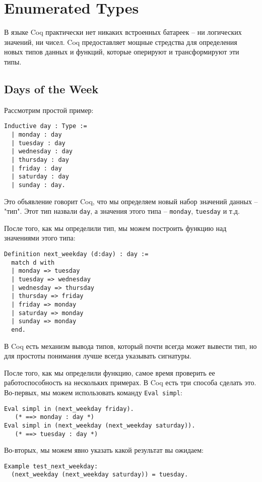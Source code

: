 \documentclass[12pt,a4paper,draft]{article}
\begin{document}
\section{Enumerated Types}

В языке Coq практически нет никаких встроенных батареек -- ни логических значений, ни чисел. Coq предоставляет мощные стредства для определения новых типов данных и функций, которые оперируют и трансформируют эти типы.

\subsection{Days of the Week}
Рассмотрим простой пример:

\begin{verbatim}
Inductive day : Type :=
  | monday : day
  | tuesday : day
  | wednesday : day
  | thursday : day
  | friday : day
  | saturday : day
  | sunday : day.
\end{verbatim}

Это объявление говорит Coq, что мы определяем новый набор значений данных -- "тип". Этот тип назвали \texttt{day}, а значения этого типа -- \texttt{monday}, \texttt{tuesday} и т.д.

После того, как мы определили тип, мы можем построить функцию над значениями этого типа:

\begin{verbatim}
Definition next_weekday (d:day) : day :=
  match d with
  | monday => tuesday
  | tuesday => wednesday
  | wednesday => thursday
  | thursday => friday
  | friday => monday
  | saturday => monday
  | sunday => monday
  end.
\end{verbatim}

В Coq есть механизм вывода типов, который почти всегда может вывести тип, но для простоты понимания лучше всегда указывать сигнатуры.

После того, как мы определили функцию, самое время проверить ее работоспособность на нескольких примерах. В Coq есть три способа сделать это. Во-первых, мы можем использовать команду \texttt{Eval simpl}:

\begin{verbatim}
Eval simpl in (next_weekday friday).
   (* ==> monday : day *)
Eval simpl in (next_weekday (next_weekday saturday)).
   (* ==> tuesday : day *)
\end{verbatim}

Во-вторых, мы можем явно указать какой результат вы ожидаем:

\begin{verbatim}
Example test_next_weekday:
  (next_weekday (next_weekday saturday)) = tuesday.
\end{verbatim}
\end{document}
